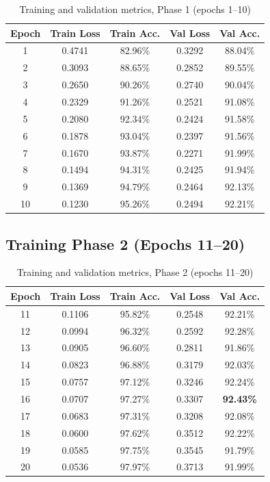 \documentclass[12pt,a4paper]{report}
\begin{document}
\begin{table}[H]
\centering
\caption{Training and validation metrics, Phase 1 (epochs 1--10)}
\label{tab:phase1}
\begin{tabular}{@{}ccccc@{}}
\toprule
\textbf{Epoch} & \textbf{Train Loss} & \textbf{Train Acc.} & \textbf{Val Loss} & \textbf{Val Acc.} \\
\midrule
1  & 0.4741 & 82.96\% & 0.3292 & 88.04\% \\
2  & 0.3093 & 88.65\% & 0.2852 & 89.55\% \\
3  & 0.2650 & 90.26\% & 0.2740 & 90.04\% \\
4  & 0.2329 & 91.26\% & 0.2521 & 91.08\% \\
5  & 0.2080 & 92.34\% & 0.2424 & 91.58\% \\
6  & 0.1878 & 93.04\% & 0.2397 & 91.56\% \\
7  & 0.1670 & 93.87\% & 0.2271 & 91.99\% \\
8  & 0.1494 & 94.31\% & 0.2425 & 91.94\% \\
9  & 0.1369 & 94.79\% & 0.2464 & 92.13\% \\
10 & 0.1230 & 95.26\% & 0.2494 & 92.21\% \\
\bottomrule
\end{tabular}
\end{table}

\subsection{Training Phase 2 (Epochs 11--20)}

\begin{table}[H]
\centering
\caption{Training and validation metrics, Phase 2 (epochs 11--20)}
\label{tab:phase2}
\begin{tabular}{@{}ccccc@{}}
\toprule
\textbf{Epoch} & \textbf{Train Loss} & \textbf{Train Acc.} & \textbf{Val Loss} & \textbf{Val Acc.} \\
\midrule
11 & 0.1106 & 95.82\% & 0.2548 & 92.21\% \\
12 & 0.0994 & 96.32\% & 0.2592 & 92.28\% \\
13 & 0.0905 & 96.60\% & 0.2811 & 91.86\% \\
14 & 0.0823 & 96.88\% & 0.3179 & 92.03\% \\
15 & 0.0757 & 97.12\% & 0.3246 & 92.24\% \\
16 & 0.0707 & 97.27\% & 0.3307 & \textbf{92.43\%} \\
17 & 0.0683 & 97.31\% & 0.3208 & 92.08\% \\
18 & 0.0600 & 97.62\% & 0.3512 & 92.22\% \\
19 & 0.0585 & 97.75\% & 0.3545 & 91.79\% \\
20 & 0.0536 & 97.97\% & 0.3713 & 91.99\% \\
\bottomrule
\end{tabular}
\end{table}
\end{document}
